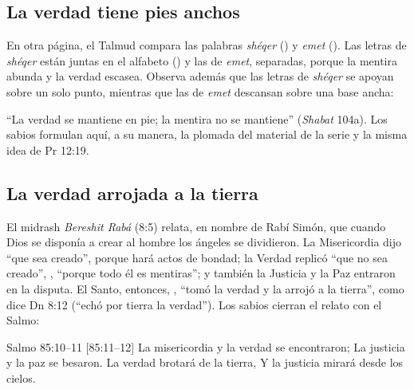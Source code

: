 
\subsection{La verdad tiene pies anchos}
En otra página, el Talmud compara las palabras \emph{shéqer} () y \emph{emet} (). Las letras de \emph{shéqer} están juntas en el alfabeto () y las de \emph{emet}, separadas, porque la mentira abunda y la verdad escasea. Observa además que las letras de \emph{shéqer} se apoyan sobre un solo punto, mientras que las de \emph{emet} descansan sobre una base ancha:


``La verdad se mantiene en pie; la mentira no se mantiene'' (\emph{Shabat} 104a). Los sabios formulan aquí, a su manera, la plomada del material de la serie y la misma idea de Pr 12:19.


\subsection{La verdad arrojada a la tierra}
El midrash \emph{Bereshit Rabá} (8:5) relata, en nombre de Rabí Simón, que cuando Dios se disponía a crear al hombre los ángeles se dividieron. La Misericordia dijo ``que sea creado'', porque hará actos de bondad; la Verdad replicó ``que no sea creado'', , ``porque todo él es mentiras''; y también la Justicia y la Paz entraron en la disputa. El Santo, entonces, , ``tomó la verdad y la arrojó a la tierra'', como dice Dn 8:12 (``echó por tierra la verdad''). Los sabios cierran el relato con el Salmo:

\begin{verso}{Salmo 85:10–11 [85:11–12]}
La misericordia y la verdad se encontraron; La justicia y la paz se besaron. La verdad brotará de la tierra, Y la justicia mirará desde los cielos.
\end{verso}


